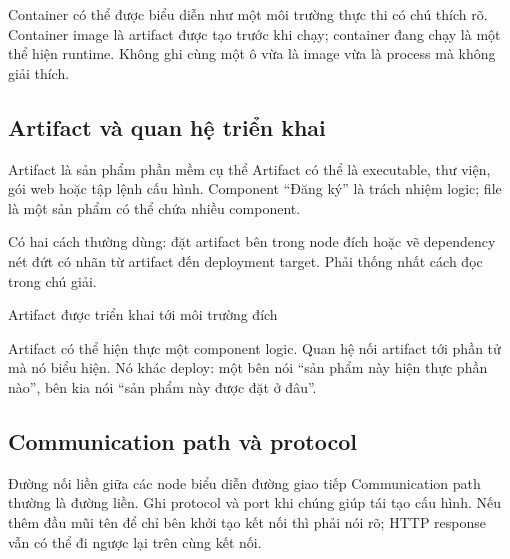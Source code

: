 Container có thể được biểu diễn như một môi trường thực thi có chú thích rõ. Container image là artifact được tạo trước khi chạy; container đang chạy là một thể hiện runtime. Không ghi cùng một ô vừa là image vừa là process mà không giải thích.

\subsection{Artifact và quan hệ triển khai}
  {Artifact là sản phẩm phần mềm cụ thể}
Artifact có thể là executable, thư viện, gói web hoặc tập lệnh cấu hình. Component ``Đăng ký'' là trách nhiệm logic; file  là một sản phẩm có thể chứa nhiều component.

Có hai cách thường dùng: đặt artifact bên trong node đích hoặc vẽ dependency nét đứt có nhãn  từ artifact đến deployment target. Phải thống nhất cách đọc trong chú giải.

  {Artifact được triển khai tới môi trường đích}

Artifact có thể hiện thực một component logic. Quan hệ  nối artifact tới phần tử mà nó biểu hiện. Nó khác deploy: một bên nói ``sản phẩm này hiện thực phần nào'', bên kia nói ``sản phẩm này được đặt ở đâu''.

\subsection{Communication path và protocol}
  {Đường nối liền giữa các node biểu diễn đường giao tiếp}
Communication path thường là đường liền. Ghi protocol và port khi chúng giúp tái tạo cấu hình. Nếu thêm đầu mũi tên để chỉ bên khởi tạo kết nối thì phải nói rõ; HTTP response vẫn có thể đi ngược lại trên cùng kết nối.

